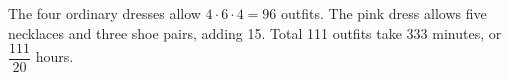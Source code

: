 The four ordinary dresses allow $4\cdot6\cdot4=96$ outfits. The pink dress allows five necklaces and three shoe pairs, adding 15. Total 111 outfits take 333 minutes, or $\boxed{\dfrac{111}{20}}$ hours.
